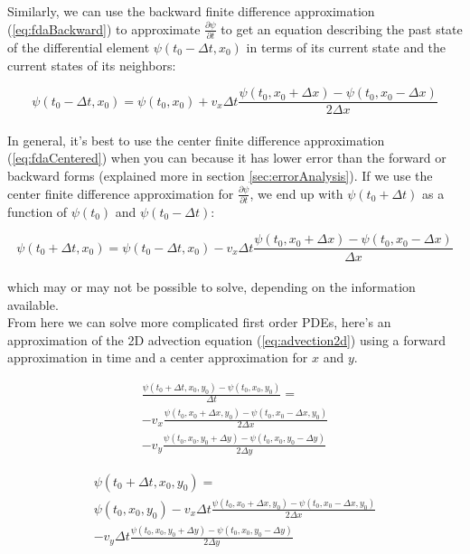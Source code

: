 {Similarly, we can use the backward finite difference approximation (\ref{eq:fdaBackward}) to approximate $\frac{\partial \psi}{\partial t}$ to get an equation describing the past state of the differential element $\psi(t_{0}-\Delta t, x_{0})$ in terms of its current state and the current states of its neighbors:

  \begin{equation}
  \psi(t_{0} - \Delta  t,  x_{0}) = \psi(t_{0}, x_{0}) + v_{x}\Delta t \frac{\psi(t_{0}, x_{0} + \Delta  x)-\psi(t_{0}, x_{0}-\Delta x)}{2\Delta  x}
  \end{equation}
  \\
  In general, it's best to use the center finite difference approximation (\ref{eq:fdaCentered}) when you can because it has lower error than the forward or backward forms (explained more in section \ref{sec:errorAnalysis}).  If we use the center finite difference approximation for $\frac{\partial \psi}{\partial t}$, we end up with $\psi(t_{0}+\Delta t)$ as a function of $\psi(t_{0})$ and $\psi(t_{0}-\Delta t)$:
  
     \begin{equation}
  \psi(t_{0} + \Delta  t,  x_{0}) = \psi(t_{0}-\Delta t, x_{0}) -v_{x}\Delta t \frac{\psi(t_{0}, x_{0} + \Delta  x)-\psi(t_{0}, x_{0}-\Delta x)}{\Delta  x}
  \end{equation}
  \\
  which may or may not be possible to solve, depending on the information available.\\
  
  From here we can solve more complicated first order PDEs, here's an approximation of the 2D advection equation (\ref{eq:advection2d}) using a forward approximation in time and a center approximation for $x$ and $y$.
  
\begin{multline}
   \frac{ \psi(t_{0} + \Delta  t,  x_{0}, y_{0}) - \psi(t_{0}, x_{0}, y_{0})}{\Delta t} = \\
   -v_{x}\frac{\psi(t_{0}, x_{0} + \Delta  x, y_{0})-\psi(t_{0}, x_{0}-\Delta x, y_{0})}{2\Delta  x}\\
   -v_{y}\frac{\psi(t_{0}, x_{0}, y_{0} + \Delta  y)-\psi(t_{0}, x_{0}, y_{0}-\Delta y)}{2\Delta  y}
\end{multline}

\begin{multline}\label{eq:advection2Dapprox}
   \psi(t_{0} + \Delta  t,  x_{0}, y_{0}) =\\
   \psi(t_{0}, x_{0}, y_{0}) -v_{x}\Delta t\frac{\psi(t_{0}, x_{0} + \Delta  x, y_{0})-\psi(t_{0}, x_{0}-\Delta x, y_{0})}{2\Delta  x}\\
   -v_{y}\Delta t\frac{\psi(t_{0}, x_{0}, y_{0} + \Delta  y)-\psi(t_{0}, x_{0}, y_{0}-\Delta y)}{2\Delta  y} 
\end{multline}
\\
}
